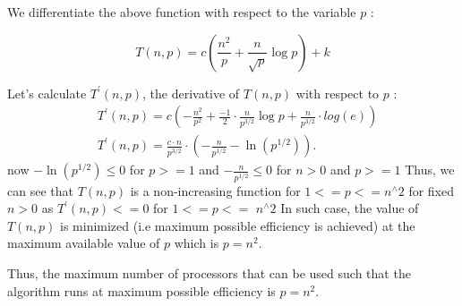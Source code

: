 \documentclass{article}
\begin{document}
We differentiate the above function with respect to the variable $p$ :\par
$$
T(n, p)=c\left(\frac{n^2}{p}+\frac{n}{\sqrt{p}} \log p\right)+k
$$

Let's calculate $T^{\prime}(n, p)$, the derivative of $T(n, p)$ with respect to $p$ :
$$
\begin{aligned}
& T^{\prime}(n, p)=c\left(-\frac{n^2}{p^2}+\frac{-1}{2} \cdot \frac{n}{p^{3 / 2}} \log p+\frac{n}{p^{3 / 2}} \cdot log(e)\right) \\
& T^{\prime}(n, p)=\frac{c \cdot n}{p^{3 / 2}} \cdot\left(-\frac{n}{p^{1 / 2}}-\ln \left(p^{1 / 2}\right)\right).
\end{aligned}
$$
now $-\ln \left(p^{1 / 2}\right) \leq 0$ for $p>=1$ and $-\frac{n}{p^{1 / 2}} \leq 0$ for $n>0$ and $p>=1$
Thus, we can see that $T(n, p)$ is a non-increasing function for $1<=p<=n^{\wedge} 2$ for fixed $n>0$ as $T^{\prime}(n, p)<=0$ for $1<=p<=$ $n^{\wedge} 2$ In such case, the value of $T(n, p)$ is minimized (i.e maximum possible efficiency is achieved) at the maximum available value of $p$ which is $p=n^2$.

Thus, the maximum number of processors that can be used such that the algorithm runs at maximum possible efficiency is $p=n^2$.
\end{document}
